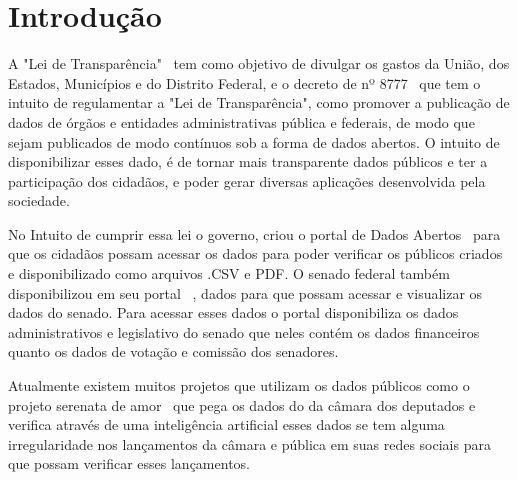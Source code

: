 \section{\esp Introdução}

A "Lei de Transparência"~\cite{LeiC131:2009} tem como objetivo de divulgar os gastos da União, dos Estados, Municípios e do Distrito Federal, e o decreto de  nº 8777~\cite{Decreto8777:2016} que tem o intuito de regulamentar a "Lei de Transparência", como promover a publicação de dados de órgãos e  entidades administrativas pública e federais, de modo que sejam publicados de modo contínuos sob a forma de dados abertos. O intuito de disponibilizar esses dado, é de tornar mais transparente dados públicos e ter a participação dos cidadãos, e poder gerar diversas aplicações desenvolvida pela sociedade.

No Intuito de cumprir essa lei o governo, criou o portal de Dados Abertos~\cite{Dados.gov:2020}  para que os cidadãos possam acessar os dados para poder verificar os públicos criados e disponibilizado como arquivos .CSV e PDF. O senado federal também disponibilizou em seu portal~\cite{Senado:2020} , dados para que possam acessar e visualizar os dados do senado. Para acessar esses dados o portal disponibiliza os dados administrativos e legislativo do senado que neles contém os dados financeiros quanto os dados de votação e comissão dos senadores. 

Atualmente existem muitos projetos que utilizam os dados públicos como o projeto serenata de amor~\cite{Serenata:2020} que pega os dados do da câmara dos deputados e verifica através de uma inteligência artificial esses dados se tem alguma irregularidade nos lançamentos da câmara e pública em suas redes sociais para que possam verificar esses lançamentos. 

